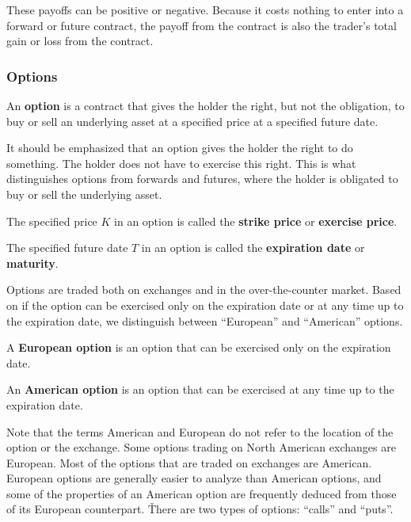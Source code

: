 These payoffs can be positive or negative. Because it costs nothing to enter into a forward or future contract, the
payoff from the contract is also the trader's total gain or loss from the contract.

\vspace{5pt}

\subsubsection{Options}

\bd[Option]
An \textbf{option} is a contract that gives the holder the right, but not the obligation, to buy or sell an underlying
asset at a specified price at a specified future date.
\ed

It should be emphasized that an option gives the holder the right to do something. The holder does not have to
exercise this right. This is what distinguishes options from forwards and futures, where the holder is obligated to
buy or sell the underlying asset.

The specified price $K$ in an option is called the \textbf{strike price} or \textbf{exercise price}.
\ed

The specified future date $T$ in an option is called the \textbf{expiration date} or \textbf{maturity}.
\ed

Options are traded both on exchanges and in the over-the-counter market. Based on if the option can be exercised only
on the expiration date or at any time up to the expiration date, we distinguish between ``European'' and ``American''
options.

A \textbf{European option} is an option that can be exercised only on the expiration date.
\ed

An \textbf{American option} is an option that can be exercised at any time up to the expiration date.
\ed

Note that the terms American and European do not refer to the location of the option or the exchange. Some options
trading on North American exchanges are European. Most of the options that are traded on exchanges are American.
European options are generally easier to analyze than American options, and some of the properties of an American
option are frequently deduced from those of its European counterpart. \v

There are two types of options: ``calls'' and ``puts''.

